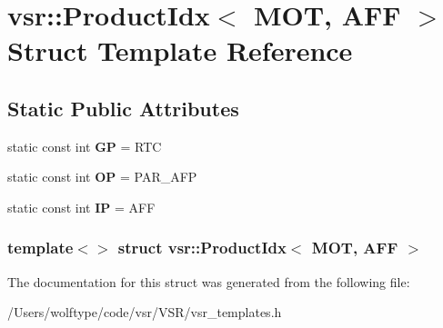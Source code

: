 \hypertarget{structvsr_1_1_product_idx_3_01_m_o_t_00_01_a_f_f_01_4}{\section{vsr\-:\-:Product\-Idx$<$ M\-O\-T, A\-F\-F $>$ Struct Template Reference}
\label{structvsr_1_1_product_idx_3_01_m_o_t_00_01_a_f_f_01_4}
}
\subsection*{Static Public Attributes}
\begin{DoxyCompactItemize}
\item 
\hypertarget{structvsr_1_1_product_idx_3_01_m_o_t_00_01_a_f_f_01_4_ace61c855f464996f9c43077a5b35e457}{static const int {\bfseries G\-P} = R\-T\-C}\label{structvsr_1_1_product_idx_3_01_m_o_t_00_01_a_f_f_01_4_ace61c855f464996f9c43077a5b35e457}

\item 
\hypertarget{structvsr_1_1_product_idx_3_01_m_o_t_00_01_a_f_f_01_4_aa9cbd596187e424966cbafa9986b2127}{static const int {\bfseries O\-P} = P\-A\-R\-\_\-\-A\-F\-P}\label{structvsr_1_1_product_idx_3_01_m_o_t_00_01_a_f_f_01_4_aa9cbd596187e424966cbafa9986b2127}

\item 
\hypertarget{structvsr_1_1_product_idx_3_01_m_o_t_00_01_a_f_f_01_4_ab06162e514e7aef786294dddbed68f5a}{static const int {\bfseries I\-P} = A\-F\-F}\label{structvsr_1_1_product_idx_3_01_m_o_t_00_01_a_f_f_01_4_ab06162e514e7aef786294dddbed68f5a}

\end{DoxyCompactItemize}
\subsubsection*{template$<$$>$ struct vsr\-::\-Product\-Idx$<$ M\-O\-T, A\-F\-F $>$}



The documentation for this struct was generated from the following file\-:\begin{DoxyCompactItemize}
\item 
/\-Users/wolftype/code/vsr/\-V\-S\-R/vsr\-\_\-templates.\-h\end{DoxyCompactItemize}
